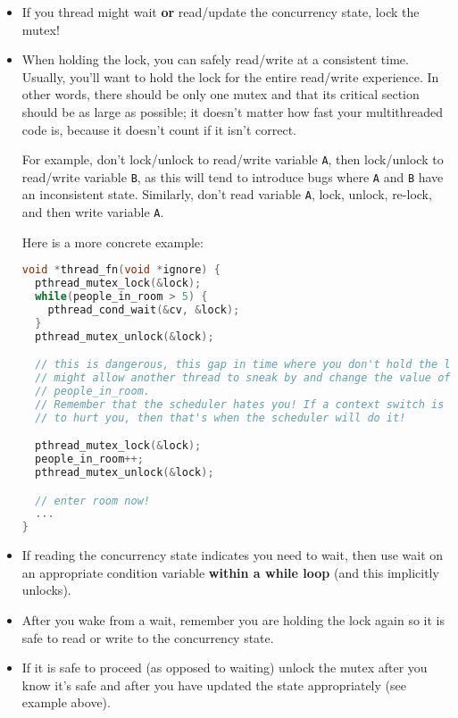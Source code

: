 \documentclass[11pt,usletter]{article}
\begin{document}
\begin{itemize}
  \item If you thread might wait {\bf or} read/update the concurrency state,
    lock the mutex!

  \item When holding the lock, you can safely read/write at a consistent time.
    Usually, you'll want to hold the lock for the entire read/write experience.
    In other words, there should be only one mutex and that its critical
    section should be as large as possible; it doesn’t matter how fast your
    multithreaded code is, because it doesn’t count if it isn’t correct.

    \noindent For example, don't lock/unlock to read/write variable {\tt A},
    then lock/unlock to read/write variable {\tt B}, as this will tend to
    introduce bugs where {\tt A} and {\tt B} have an inconsistent state.
    Similarly, don't read variable {\tt A}, lock, unlock, re-lock, and then
    write variable {\tt A}.

    Here is a more concrete example:

    \begin{lstlisting}[style=netseclab,language=c]
void *thread_fn(void *ignore) {
  pthread_mutex_lock(&lock);
  while(people_in_room > 5) {
    pthread_cond_wait(&cv, &lock);
  }
  pthread_mutex_unlock(&lock);

  // this is dangerous, this gap in time where you don't hold the lock
  // might allow another thread to sneak by and change the value of
  // people_in_room.
  // Remember that the scheduler hates you! If a context switch is going
  // to hurt you, then that's when the scheduler will do it!

  pthread_mutex_lock(&lock);
  people_in_room++;
  pthread_mutex_unlock(&lock);

  // enter room now!
  ...
}
    \end{lstlisting}

  \item If reading the concurrency state indicates you need to wait, then use
    wait on an appropriate condition variable {\bf within a while loop} (and
    this implicitly unlocks).

  \item  After you wake from a wait, remember you are holding the lock again so
    it is safe to read or write to the concurrency state.

  \item  If it is safe to proceed (as opposed to waiting) unlock the mutex
    after you know it’s safe and after you have updated the state appropriately
    (see example above).


\end{itemize}
\end{document}
